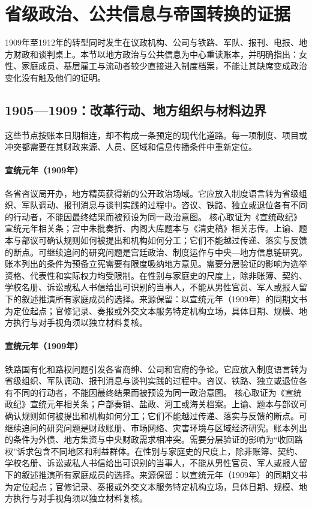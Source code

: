 \section{省级政治、公共信息与帝国转换的证据}
1909年至1912年的转型同时发生在议政机构、公司与铁路、军队、报刊、电报、地方财政和谈判桌上。本节以地方政治与公共信息为中心重读账本，并明确指出：女性、家庭成员、基层雇工与流动者较少直接进入制度档案，不能让其缺席变成政治变化没有触及他们的证明。
\subsection{1905—1909：改革行动、地方组织与材料边界}
这些节点按账本日期相连，却不构成一条预定的现代化道路。每一项制度、项目或冲突都需要在其财政来源、人员、区域和信息传播条件中重新定位。
\hypertarget{public:EQ-1909-PROVINCIAL-ASSEMBLIES}{}\paragraph{宣统元年（1909年）}各省咨议局开办，地方精英获得新的公开政治场域。它应放入制度语言转为省级组织、军队调动、报刊消息与谈判实践的过程中。咨议、铁路、独立或退位各有不同的行动者，不能因最终结果而被预设为同一政治意图。 核心取证为《宣统政纪》宣统元年相关条；宫中朱批奏折、内阁大库题本与《清史稿》相关志传。上谕、题本与部议可确认规则如何被提出和机构如何分工；它们不能越过传递、落实与反馈的断点。可继续追问的研究问题是宫廷政治、制度运作与中央—地方信息链研究。账本列出的条件为预备立宪需要有限度吸纳地方意见。需要分层验证的影响为选举资格、代表性和实际权力均受限制。在性别与家庭史的尺度上，除非账簿、契约、学校名册、诉讼或私人书信给出可识别的当事人，不能从男性官员、军人或报人留下的叙述推演所有家庭成员的选择。来源保留：以宣统元年（1909年）的同期文书为定位起点；官修记录、奏报或外交文本服务特定机构立场，具体日期、规模、地方执行与对手视角须以独立材料复核。
\hypertarget{public:EQ-1909-RAILWAY-RECOVERY-MOVEMENT}{}\paragraph{宣统元年（1909年）}铁路国有化和路权问题引发各省商绅、公司和官府的争论。它应放入制度语言转为省级组织、军队调动、报刊消息与谈判实践的过程中。咨议、铁路、独立或退位各有不同的行动者，不能因最终结果而被预设为同一政治意图。 核心取证为《宣统政纪》宣统元年相关条；户部奏销、盐政、河工或海关档案。上谕、题本与部议可确认规则如何被提出和机构如何分工；它们不能越过传递、落实与反馈的断点。可继续追问的研究问题是财政账册、市场网络、灾害环境与区域经济研究。账本列出的条件为外债、地方集资与中央财政需求相冲突。需要分层验证的影响为“收回路权”诉求包含不同地区和利益群体。在性别与家庭史的尺度上，除非账簿、契约、学校名册、诉讼或私人书信给出可识别的当事人，不能从男性官员、军人或报人留下的叙述推演所有家庭成员的选择。来源保留：以宣统元年（1909年）的同期文书为定位起点；官修记录、奏报或外交文本服务特定机构立场，具体日期、规模、地方执行与对手视角须以独立材料复核。
